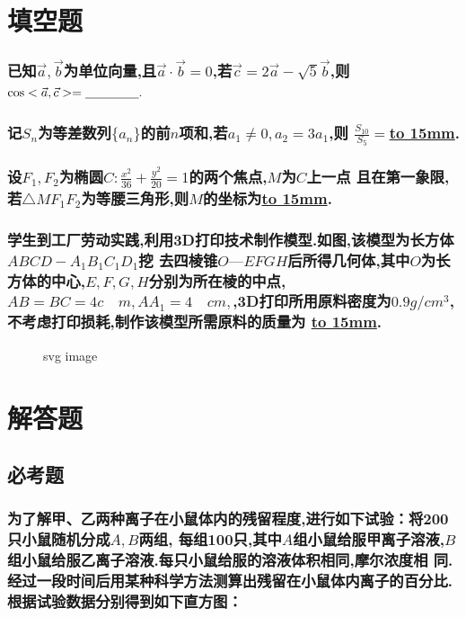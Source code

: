 \documentclass[UTF8]{ctexart}
\begin{document}
\section{填空题}
\subsubsection{已知$\vec{a},\vec{b}$为单位向量,且$\vec{a}\cdot
        \vec{b}=0$,若$\vec{c}=2\vec{a}-\sqrt{5}\vec{b}$,则
    $\cos<\vec{a},\vec{c}> =\underline{\hbox to 15mm{}}.$}
\subsubsection{记$S_n$为等差数列$\{a_n\}$的前$n$项和,若$a_1\neq 0,a_2=3a_1$,则
    $\frac{S_{10}}{S_5}=$\underline{\hbox to 15mm{}}.}
\subsubsection{设$F_1,F_2$为椭圆$C:\frac{x^2}{36}+\frac{y^2}{20}=1$的两个焦点,$M$为$C$上一点
    且在第一象限,若$\triangle MF_1F_2$为等腰三角形,则$M$的坐标为\underline{\hbox to 15mm{}}.}
\subsubsection{学生到工厂劳动实践,利用3D打印技术制作模型.如图,该模型为长方体$ABCD-A_1B_1C_1D_1$挖
    去四棱锥$O—EFGH$后所得几何体,其中$O$为长方体的中心,$E,F,G,H$分别为所在棱的中点,$AB=BC=4c\quad m,
        AA_1=4\quad cm,$,3D打印所用原料密度为$0.9 g/cm^3$,不考虑打印损耗,制作该模型所需原料的质量为
    \underline{\hbox to 15mm{}}.}
\begin{figure}[htbp]
    \centering
    
    \caption{svg image}
\end{figure}
\section{解答题}
\subsection{必考题}
\subsubsection{为了解甲、乙两种离子在小鼠体内的残留程度,进行如下试验：将200只小鼠随机分成$A,B$两组,
    每组100只,其中$A$组小鼠给服甲离子溶液,$B$组小鼠给服乙离子溶液.每只小鼠给服的溶液体积相同,摩尔浓度相
    同.经过一段时间后用某种科学方法测算出残留在小鼠体内离子的百分比.根据试验数据分别得到如下直方图：}
\end{document}
